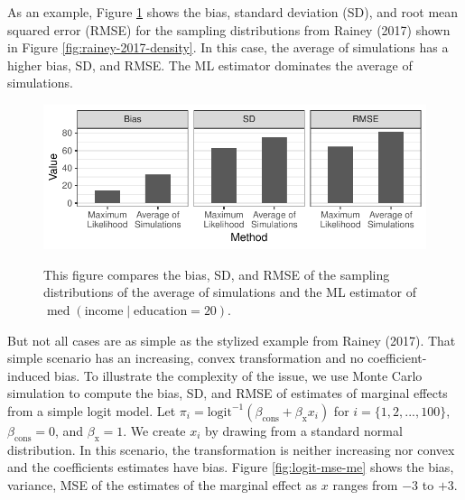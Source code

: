 \documentclass[11pt]{article}
\DeclareMathOperator{\med}{med}
\begin{document}
As an example, Figure \ref{fig:rainey-2017-summary} shows the bias, standard deviation (SD), and root mean squared error (RMSE) for the sampling distributions from Rainey (2017) shown in Figure \ref{fig:rainey-2017-density}. In this case, the average of simulations has a higher bias, SD, and RMSE. The ML estimator dominates the average of simulations. 

\begin{figure}[h!]
\begin{center}
\includegraphics[scale = 0.75]{figs/rainey-2017-summary.pdf}\\
\vspace{.1in}
\caption{This figure compares the bias, SD, and RMSE of the sampling distributions of the average of simulations and the ML estimator of $\med(\text{income} \mid \text{education} = 20)$.}\label{fig:rainey-2017-summary}
\end{center}
\end{figure}

But not all cases are as simple as the stylized example from Rainey (2017). That simple scenario has an increasing, convex transformation and no coefficient-induced bias. To illustrate the complexity of the issue, we use Monte Carlo simulation to compute the bias, SD, and RMSE of estimates of marginal effects from a simple logit model. Let $\pi_i = \text{logit}^{-1}(\beta_\text{cons} + \beta_\text{x}x_i)$ for $i = \{1, 2, ..., 100\}$,  $\beta_\text{cons} = 0$, and $\beta_\text{x} = 1$. We create $x_i$ by drawing from a standard normal distribution. In this scenario, the transformation is neither increasing nor convex and the coefficients estimates have bias. Figure \ref{fig:logit-mse-me} shows the bias, variance, MSE of the estimates of the marginal effect as $x$ ranges from $-3$ to $+3$. 
\end{document}
